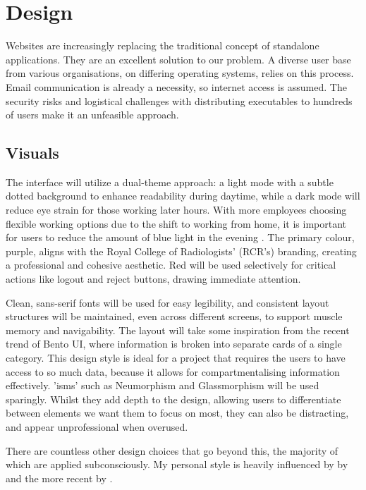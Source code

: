 \chapter{Design} \label{Design}
\begin{spacing}{0.8}
\small
Websites are increasingly replacing the traditional concept of standalone applications. They are an excellent solution to our problem. A diverse user base from various organisations, on differing operating systems, relies on this process. Email communication is already a necessity, so internet access is assumed. The security risks and logistical challenges with distributing executables to hundreds of users make it an unfeasible approach.
\end{spacing}
\vspace{-8pt}
\section{Visuals}
The interface will utilize a dual-theme approach: a light mode with a subtle dotted background to enhance readability during daytime, while a dark mode will reduce eye strain for those working later hours. With more employees choosing flexible working options due to the shift to working from home, it is important for users to reduce the amount of blue light in the evening \parencite{cipd2023flexible}. The primary colour, purple, aligns with the Royal College of Radiologists' (RCR’s) branding, creating a professional and cohesive aesthetic. Red will be used selectively for critical actions like logout and reject buttons, drawing immediate attention.

Clean, sans-serif fonts will be used for easy legibility, and consistent layout structures will be maintained, even across different screens, to support muscle memory and navigability. The layout will take some inspiration from the recent trend of Bento UI, where information is broken into separate cards of a single category. This design style is ideal for a project that requires the users to have access to so much data, because it allows for compartmentalising information effectively. 'isms' such as Neumorphism and Glassmorphism will be used sparingly. Whilst they add depth to the design, allowing users to differentiate between elements we want them to focus on most, they can also be distracting, and appear unprofessional when overused.

There are countless other design choices that go beyond this, the majority of which are applied subconsciously. My personal style is heavily influenced by  by \textcite{muller-brockmann_grid_1981} and the more recent  by \textcite{wathan_refactoring_2018}.

